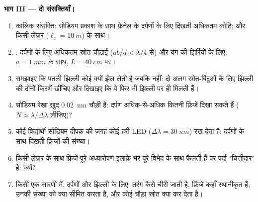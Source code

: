 \begin{problem}
\medskip
\noindent\textbf{भाग III --- दो संसक्तियाँ।}
\begin{enumerate}[resume]
  \item कालिक संसक्ति: सोडियम प्रकाश के साथ फ्रेनेल के दर्पणों के लिए
        दिखती अधिकतम कोटि; और किसी लेज़र ($\ell_c = \qty{10}{m}$) के साथ।
  \item {}: दर्पणों के लिए अधिकतम स्रोत-चौड़ाई
        ($ab/d < \lambda/4$ से) और यंग की झिर्रियों के लिए, $a = \qty{1}{mm}$ के
        साथ, $L = \qty{40}{cm}$ पर।
  \item समझाइए कि पतली झिल्ली कोई  क्यों झेल लेती है जबकि
         नहीं: दो अलग स्रोत-बिंदुओं के लिए झिल्ली की दोनों
        किरणें खींचिए और दिखाइए कि वे फिर भी झिल्ली पर ही मिलती हैं।
  \item सोडियम रेखा ख़ुद \qty{0.02}{nm} चौड़ी है: दर्पण अधिक-से-अधिक कितनी
        फ्रिंजें दिखा सकते हैं ($N \approx \lambda/\Delta\lambda$ लीजिए)?
  \item कोई विद्यार्थी सोडियम दीपक की जगह कोई हरी LED ($\Delta\lambda =
        \qty{30}{nm}$) रख देता है: दर्पणों के साथ दिखती फ्रिंजों की संख्या।
  \item किसी लेज़र के साथ फ्रिंजें पूरे अध्यारोपण-इलाक़े भर पूरे विभेद
        के साथ फैलती हैं पर पर्दा "चित्तीदार" है: क्यों?
  \item किसी एक सारणी में, दर्पणों और झिल्ली के लिए: तरंग कैसे चीरी
        जाती है, फ्रिंजें कहाँ स्थानीकृत हैं, उनकी संख्या को क्या सीमित
        करता है, और कोई चौड़ा स्रोत क्या कर देता है।
\end{enumerate}
\end{problem}
